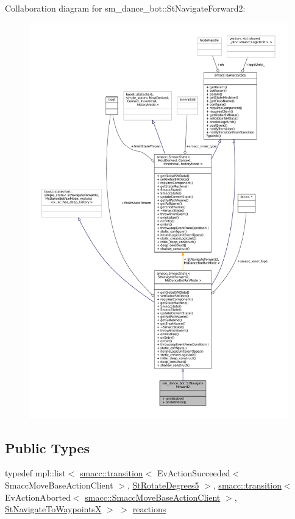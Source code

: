 Collaboration diagram for sm\+\_\+dance\+\_\+bot\+:\+:St\+Navigate\+Forward2\+:
\nopagebreak
\begin{figure}[H]
\begin{center}
\leavevmode
\includegraphics[width=350pt]{structsm__dance__bot_1_1StNavigateForward2__coll__graph}
\end{center}
\end{figure}
\subsection*{Public Types}
\begin{DoxyCompactItemize}
\item 
typedef mpl\+::list$<$ \hyperlink{classsmacc_1_1transition}{smacc\+::transition}$<$ Ev\+Action\+Succeeded$<$ Smacc\+Move\+Base\+Action\+Client $>$, \hyperlink{structsm__dance__bot_1_1StRotateDegrees5}{St\+Rotate\+Degrees5} $>$, \hyperlink{classsmacc_1_1transition}{smacc\+::transition}$<$ Ev\+Action\+Aborted$<$ \hyperlink{classsmacc_1_1SmaccMoveBaseActionClient}{smacc\+::\+Smacc\+Move\+Base\+Action\+Client} $>$, \hyperlink{structsm__dance__bot_1_1StNavigateToWaypointsX}{St\+Navigate\+To\+WaypointsX} $>$ $>$ \hyperlink{structsm__dance__bot_1_1StNavigateForward2_a15e910992cf67be54cd17c67dfd262b5}{reactions}
\end{DoxyCompactItemize}
